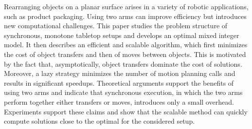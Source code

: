 Rearranging objects on a planar surface arises in a variety of
robotic applications, such as product packaging.  Using two arms can improve
efficiency but introduces new computational challenges. This paper
studies the problem structure of  synchronous,
monotone tabletop setups and develops an optimal mixed integer model. It then
describes an efficient and scalable algorithm, which first minimizes
the cost of object transfers and then of moves between objects.
This is motivated by the fact that, asymptotically, object transfers
dominate the cost of solutions. Moreover, a lazy strategy minimizes
the number of motion planning calls and results in significant
speedups.  Theoretical arguments support the benefits of using two
arms and indicate that synchronous execution, in which the two arms perform together either transfers or moves, introduces only a small
overhead.  Experiments support these claims and show that the
scalable method can quickly compute solutions close to the optimal for
the considered setup.
